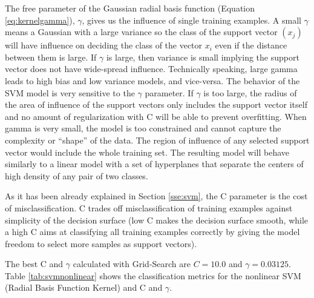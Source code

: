 \documentclass[11pt]{article}
\theoremstyle{definition}
\theoremstyle{remark}
\begin{document}
The free parameter of the Gaussian radial basis function (Equation \ref{eq:kernelgamma}), $\gamma$, gives us the influence of  single training examples. 
A small  $\gamma$ means a Gaussian with a large variance so the class of the support vector $(x_j)$ will have influence on deciding the class of the vector $x_i$ even if the distance between them is large. If  $\gamma$ is large, then variance is small implying the support vector does not have wide-spread influence. Technically speaking, large gamma leads to high bias and low variance models, and vice-versa.
The behavior of the SVM model is very sensitive to the $\gamma$ parameter. If $\gamma$ is too large, the radius of the area of influence of the support vectors only includes the support vector itself and no amount of regularization with C will be able to prevent overfitting.
When gamma is very small, the model is too constrained and cannot capture the complexity or “shape” of the data. The region of influence of any selected support vector would include the whole training set. The resulting model will behave similarly to a linear model with a set of hyperplanes that separate the centers of high density of any pair of two classes.


As it has been already explained in Section \ref{sse:svm}, the C parameter is the cost of misclassification. C trades off misclassification of training examples against simplicity of the decision surface (low C makes the decision surface smooth, while a high C aims at classifying all training examples correctly by giving the model freedom to select more samples as support vectors). 


The best C and $\gamma$ calculated with Grid-Search are $C= 10.0$ and $\gamma= 0.03125$. %
Table \ref{tab:svmnonlinear} shows the classification metrics for the nonlinear SVM (Radial Basis Function Kernel) and C and $\gamma$.
\end{document}
